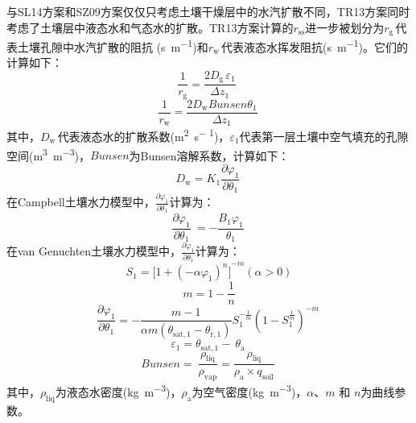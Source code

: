 \begin{enumerate}
    与SL14方案和SZ09方案仅仅只考虑土壤干燥层中的水汽扩散不同，TR13方案同时考虑了土壤层中液态水和气态水的扩散。TR13方案计算的\(r_{\mathrm{ss}}\)进一步被划分为\(r_{\mathrm{g\ }}\)代表土壤孔隙中水汽扩散的阻抗 (\unit{s.m^{-1}})和\(r_{\mathrm{w\ }}\)代表液态水挥发阻抗(\unit{s.m^{-1}})。它们的计算如下：
    \begin{equation}
      \frac{1}{r_{\mathrm{\mathrm{g}}}} = \frac{2D_{\mathrm{g\ }}\varepsilon_{1}}
      {\Delta z_{1}}\ \
    \end{equation}
    \begin{equation}
      \frac{1}{r_{\mathrm{w}}} = \frac{2D_{\mathrm{w}}Bunsen\theta_{1}}
      {\Delta z_{1}}\
    \end{equation}
    其中，\(D_{\mathrm{w\ }}\)代表液态水的扩散系数(\unit{m^{2}.s^{- 1}})，\(\varepsilon_{1}\)代表第一层土壤中空气填充的孔隙空间(\unit{m^{3}.m^{-3}})，\(Bunsen\)为Bunsen溶解系数，计算如下：
    \begin{equation}
      D_{\mathrm{w}} = K_{1}\frac{\partial\varphi_{1}}{\partial\theta_{1}}\
    \end{equation}
    在Campbell土壤水力模型中，\(\frac{\partial\varphi_{1}}{\partial\theta_{1}}\)计算为：
    \begin{equation}
      \frac{\partial\varphi_{1}}{\partial\theta_{1}}\  = - \frac{B_{1}\varphi_{1}}{\theta_{1}}\
    \end{equation}
    在van Genuchten土壤水力模型中，\(\frac{\partial\varphi_{1}}{\partial\theta_{1}}\)计算为：
    \begin{equation}
      S_{1} = {\lbrack 1 + ( - \alpha\varphi_{1})^{n}\rbrack}^{- m}(\alpha > 0)
    \end{equation}
    \begin{equation}
      m = 1-\frac{1}{n}
    \end{equation}
    \begin{equation}
      \frac{\partial\varphi_{1}}{\partial\theta_{1}} = - \frac{m - 1}{\alpha m\left( \theta_{\mathrm{sat,1}} - \theta_{\mathrm{r,1}} \right)}S_{1}^{- \frac{1}{m}}\left( 1 - S_{1}^{\frac{1}{m}} \right)^{- m}\
    \end{equation}
    \begin{equation}
      \varepsilon_{1} = \theta_{\mathrm{sat,1}} - \ \theta_{\mathrm{a}}\
    \end{equation}
    \begin{equation}
      Bunsen = \ \frac{\rho_{\mathrm{liq}}}{\rho_{\mathrm{vap}}} = \frac{\rho_{\mathrm{liq}}}{\rho_{\mathrm{a}} \times q_{\mathrm{soil}}}\
    \end{equation}
    其中，\(\rho_{\mathrm{liq}}\)为液态水密度(\unit{{kg}.m^{-3}})，\(\rho_{\mathrm{a}}\)为空气密度(\unit{{kg}.m^{-3}})，$\alpha$、$m$ 和 $n$为曲线参数。


\end{enumerate}
